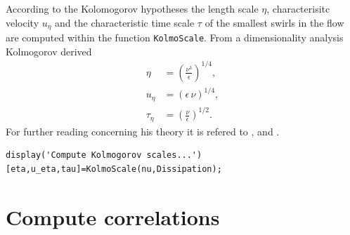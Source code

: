 \documentclass[preprint,12pt,ntfdMod]{elsarticle}
\begin{document}
\begin{par}

According to the Kolomogorov hypotheses the length scale $\eta$,
characterisitc velocity $u_{\eta}$ and the characteristic time scale
$\tau$ of the smallest swirls in the flow are computed
within the function \lstinline!KolmoScale!. From a dimensionality
analysis Kolmogorov derived
  \begin{eqnarray}
      \eta&=\displaystyle\left(\frac{\nu^3}{\epsilon}\right)^{1/4},\\
      u_{\eta}&=\left(\epsilon\,\nu\right)^{1/4},\\
      \tau_{\eta}&=\displaystyle\left(\frac{\nu}{\epsilon}\right)^{1/2}.
  \end{eqnarray}
For further reading concerning his theory it is refered to
\citet{Pope:2000tp}, \citet{Hinze:1975tb} and \citet{Tennekes:1972vb}.

\end{par} \vspace{1em}
\begin{lstlisting}
display('Compute Kolmogorov scales...')
[eta,u_eta,tau]=KolmoScale(nu,Dissipation);
\end{lstlisting}
\begin{par}



\end{par} \vspace{1em}


\section{Compute correlations}
\end{document}
